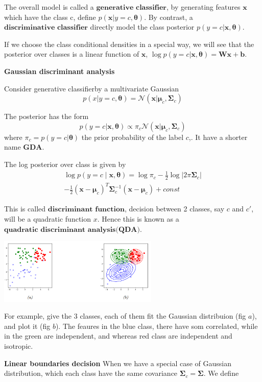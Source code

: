 \documentclass[10pt,landscape]{article}
\newcommand{\N}{\mathcal{N}}
\newcommand{\inp}{\textbf{x}}
\newcommand{\parameter}{\boldsymbol{\theta}}
\newcommand{\weight}{\mathbf{W}}
\newcommand{\Cov}{\mathbf{\Sigma}}
\newcommand{\Mean}{\boldsymbol{\mu}}
\newcommand{\bias}{\mathbf{b}}
\begin{document}
\begin{multicols*}{3}
The overall model is called a $\textbf{generative classifier}$, by generating features $\inp$ which have the class c, define $p(\inp|y=c,\parameter)$. By contrast, a $\textbf{discriminative classifier}$ directly model the class posterior $p(y=c|\inp,\parameter)$. 

If we choose the class conditional densities in a special way, we will see that the posterior over classes is a linear function of $\inp$, $\log p(y=c|\inp,\parameter)=\weight\inp+\bias$.

\textbf{Gaussian discriminant analysis}

Consider generative classifierby a multivariate Gaussian
\[
    p(x|y=c,\parameter)=\N(\inp|\Mean_c,\Cov_c)
\]

The posterior has the form
\[
    p(y=c|\inp,\parameter) \propto \pi_c \N(\inp|\Mean_c,\Cov_c)
\]
where $\pi_c = p(y=c|\parameter)$ the prior probability of the label $c$,. It have a shorter name $\textbf{GDA}$.

The log posterior over class is given by
\begin{align*}
    \log p(y=c\mid\inp,\parameter) = \log\pi_c-\frac{1}{2}\log|2\pi\Cov_c|\\ 
    -\frac{1}{2}(\inp-\Mean_c)^T\Cov_c^{-1}(\inp-\Mean_c) + const
\end{align*}

This is called $\textbf{discriminant function}$, decision between 2 classes, say $c$ and $c'$, will be a quadratic function $x$. Hence this is known as a $\textbf{quadratic discriminant analysis(QDA)}.$

\begin{minipage}{\linewidth}
    \centering
    \includegraphics[width=3in]{figures/QDA.PNG}
\end{minipage}

For example, give the 3 classes, each of them fit the Gaussian distribuion (fig $a$), and plot it (fig $b$). The feaures in the blue class, there have som correlated, while in the green are independent, and whereas red class are independent and isotropic.

\textbf{Linear boundaries decision}
When we have a special case of Gaussian distribution, which each class have the same covariance $\Cov_c=\Cov$. We define


\end{multicols*}
\end{document}
